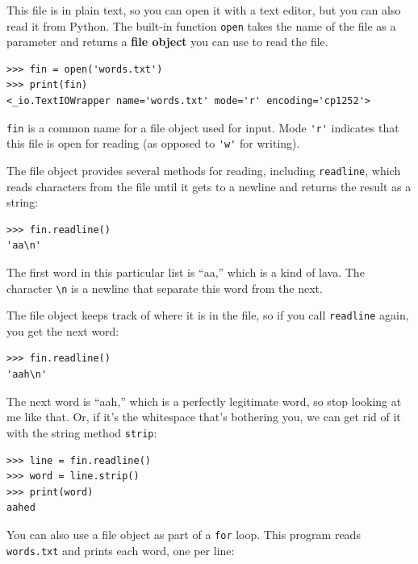 \documentclass[10pt]{book}
\begin{document}
This file is in plain text, so you can open it with a text
editor, but you can also read it from Python.  The built-in
function {\tt open} takes the name of the file as a parameter
and returns a {\bf file object} you can use to read the file.


\beforeverb
\begin{verbatim}
>>> fin = open('words.txt')
>>> print(fin)
<_io.TextIOWrapper name='words.txt' mode='r' encoding='cp1252'>
\end{verbatim}
\afterverb
%
{\tt fin} is a common name for a file object used for
input.  Mode \verb"'r'" indicates that this file is open for
reading (as opposed to \verb"'w'" for writing).


The file object provides several methods for reading, including
{\tt readline}, which reads characters from the file
until it gets to a newline and returns the result as a
string:

\beforeverb
\begin{verbatim}
>>> fin.readline()
'aa\n'
\end{verbatim}
\afterverb
%
The first word in this particular list is ``aa,'' which is a kind of
lava.  The character \verb"\n" is a newline that separate this word from the
next.

The file object keeps track of where it is in the file, so
if you call {\tt readline} again, you get the next word:

\beforeverb
\begin{verbatim}
>>> fin.readline()
'aah\n'
\end{verbatim}
\afterverb
%
The next word is ``aah,'' which is a perfectly legitimate
word, so stop looking at me like that.
Or, if it's the whitespace that's bothering you,
we can get rid of it with the string method {\tt strip}:


\beforeverb
\begin{verbatim}
>>> line = fin.readline()
>>> word = line.strip()
>>> print(word)
aahed
\end{verbatim}
\afterverb
%
You can also use a file object as part of a {\tt for} loop.
This program reads {\tt words.txt} and prints each word, one
per line:

\end{document}
